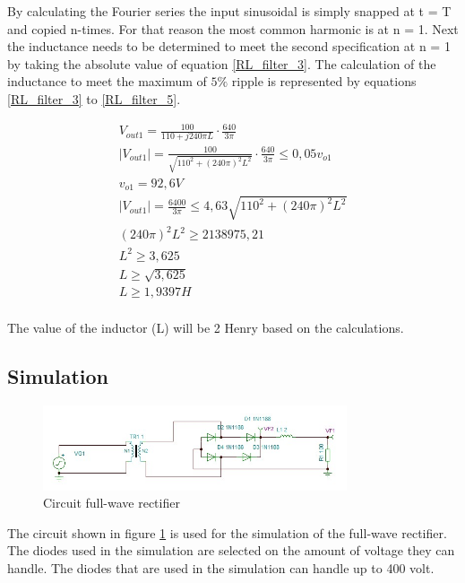 By calculating the Fourier series the input sinusoidal is simply snapped at t = T and copied n-times. For that reason the most common harmonic is at n = 1. Next the inductance needs to be determined to meet the second specification at n = 1 by taking the absolute value of equation \ref{RL_filter_3}. The calculation of the inductance to meet the maximum of $5\%$ ripple is represented by equations \ref{RL_filter_3} to \ref{RL_filter_5}.  

\begin{equation}
\label{RL_filter_5}
    \begin{split}
        V_{out1} = \frac{100}{110 + j240\pi L}\cdot \frac{640}{3\pi} \\
        |V_{out1}| = \frac{100}{\sqrt{110^2 + (240\pi)^2 L^2}} \cdot \frac{640}{3\pi} \leq 0,05 v_{o1}\\
        v_{o1} = 92,6 V\\
        |V_{out1}| = \frac{6400}{3\pi} \leq 4,63\sqrt{110^2 + (240\pi)^2 L^2}\\
        (240\pi)^2 L^2 \geq 2138975,21\\
        L^2 \geq 3,625\\
        L \geq \sqrt{3,625} \\
        L \geq 1,9397 H
    \end{split}
\end{equation}\\

The value of the inductor (L) will be 2 Henry based on the calculations.

\subsection{Simulation}

\begin{figure}[!htb]
    \centering
    \includegraphics[width=0.8\textwidth]{figuren/Circuit_FWR.JPG}
    \caption{Circuit full-wave rectifier}
    \label{fig:circuit_FWR}
\end{figure}

The circuit shown in figure \ref{fig:circuit_FWR} is used for the simulation of the full-wave rectifier. The diodes used in the simulation are selected on the amount of voltage they can handle. The diodes that are used in the simulation can handle up to 400 volt. 

